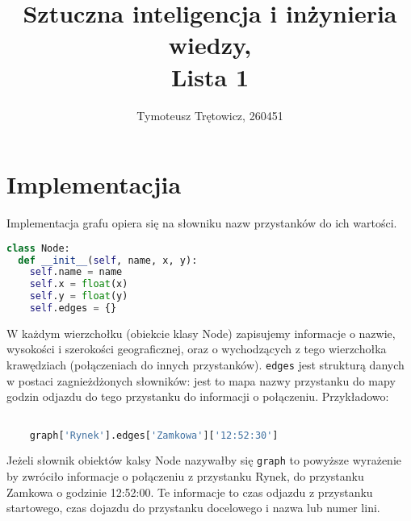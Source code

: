\documentclass[12pt,a4paper]{article}
\title{Sztuczna inteligencja i inżynieria wiedzy, \\ Lista 1}
\author{Tymoteusz Trętowicz, 260451}
\date{}
\begin{document}
    \maketitle
    \pagebreak
    \section*{Implementacjia}
    Implementacja grafu opiera się na słowniku nazw przystanków do ich wartości.
\begin{lstlisting}[language=Python]
class Node:
  def __init__(self, name, x, y):
    self.name = name
    self.x = float(x)
    self.y = float(y)
    self.edges = {}
\end{lstlisting}

    W każdym wierzchołku (obiekcie klasy Node) zapisujemy informacje o nazwie, wysokości i szerokości geograficznej, oraz o wychodzących z tego wierzchołka krawędziach (połączeniach do innych przystanków). \texttt{edges} jest strukturą danych w postaci zagnieżdżonych słowników: jest to mapa nazwy przystanku do mapy godzin odjazdu do tego przystanku do informacji o połączeniu. Przykładowo:
    \begin{lstlisting}[language=Python]

    graph['Rynek'].edges['Zamkowa']['12:52:30']
    \end{lstlisting}
    Jeżeli słownik obiektów kalsy Node nazywałby się \texttt{graph} to powyższe wyrażenie by zwróciło informacje o połączeniu z przystanku Rynek, do przystanku Zamkowa o godzinie 12:52:00. Te informacje to czas odjazdu z przystanku startowego, czas dojazdu do przystanku docelowego i nazwa lub numer lini.

    \pagebreak
\end{document}
